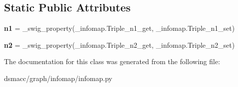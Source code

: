 \subsection*{Static Public Attributes}
\begin{DoxyCompactItemize}
\item 
\mbox{\label{classdsmacc_1_1graph_1_1infomap_1_1infomap_1_1Triple_a1d76f7515d749941f5b950199540d8fb}} 
{\bfseries n1} = \+\_\+swig\+\_\+property(\+\_\+infomap.\+Triple\+\_\+n1\+\_\+get, \+\_\+infomap.\+Triple\+\_\+n1\+\_\+set)
\item 
\mbox{\label{classdsmacc_1_1graph_1_1infomap_1_1infomap_1_1Triple_aea2a18fefcc1a5583cb0c0ed42b022f7}} 
{\bfseries n2} = \+\_\+swig\+\_\+property(\+\_\+infomap.\+Triple\+\_\+n2\+\_\+get, \+\_\+infomap.\+Triple\+\_\+n2\+\_\+set)
\end{DoxyCompactItemize}


The documentation for this class was generated from the following file\+:\begin{DoxyCompactItemize}
\item 
dsmacc/graph/infomap/infomap.\+py\end{DoxyCompactItemize}
